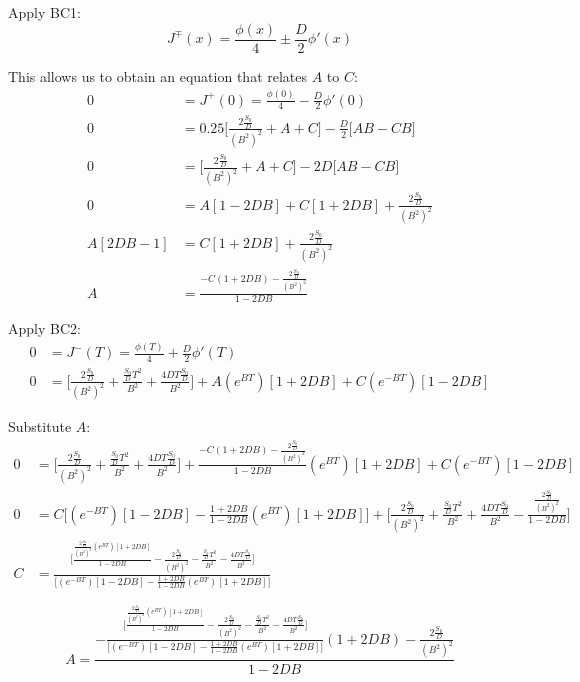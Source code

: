 \documentclass{amsart}
\theoremstyle{definition}
\begin{document}
Apply BC1:
\begin{equation*}
    J^\mp(x) = \frac{\phi(x)}{4} \pm \frac{D}{2} \phi'(x)
\end{equation*}


This allows us to obtain an equation that relates $A$ to $C$:
\begin{align*}
     0 &= J^+(0) = \frac{\phi(0)}{4} - \frac{D}{2} \phi'(0) \\
     0 &= 0.25\bigg[\frac{2\frac{S_0}{D}}{(B^2)^2}+A+C\bigg] - \frac{D}{2}\bigg[AB-CB\bigg] \\
     0 &= \bigg[\frac{2\frac{S_0}{D}}{(B^2)^2}+A+C\bigg] - 2D\bigg[AB-CB\bigg] \\
     0 &= A[1-2DB] + C[1+2DB]+\frac{2\frac{S_0}{D}}{(B^2)^2} \\
     A[2DB-1] &= C[1+2DB]+\frac{2\frac{S_0}{D}}{(B^2)^2} \\
     A &= \frac{-C(1+2DB)-\frac{2\frac{S_0}{D}}{(B^2)^2}}{1-2DB}
\end{align*}


Apply BC2:
\begin{align*}
     0 &= J^-(T) = \frac{\phi(T)}{4} + \frac{D}{2} \phi'(T) \\
     0 &= \bigg[\frac{2\frac{S_0}{D}}{(B^2)^2} + \frac{\frac{S_0}{D}T^2}{B^2}+\frac{4DT\frac{S_0}{D}}{B^2}\bigg] + A(e^{BT})[1+2DB]+C(e^{-BT})[1-2DB]
\end{align*}


Substitute $A$:
\begin{align*}
    0 &= \bigg[\frac{2\frac{S_0}{D}}{(B^2)^2} + \frac{\frac{S_0}{D}T^2}{B^2}+\frac{4DT\frac{S_0}{D}}{B^2}\bigg] + \frac{-C(1+2DB)-\frac{2\frac{S_0}{D}}{(B^2)^2}}{1-2DB}(e^{BT})[1+2DB]+C(e^{-BT})[1-2DB] \\
    0 &= C\bigg[(e^{-BT})[1-2DB] - \frac{1+2DB}{1-2DB}(e^{BT})[1+2DB]\bigg] +\bigg[\frac{2\frac{S_0}{D}}{(B^2)^2} + \frac{\frac{S_0}{D}T^2}{B^2}+\frac{4DT\frac{S_0}{D}}{B^2} - \frac{\frac{2\frac{S_0}{D}}{(B^2)^2}}{1-2DB}\bigg] \\
    C &= \frac{\bigg[\frac{\frac{2\frac{S_0}{D}}{(B^2)^2}(e^{BT})[1+2DB]}{1-2DB} - \frac{2\frac{S_0}{D}}{(B^2)^2} - \frac{\frac{S_0}{D}T^2}{B^2}-\frac{4DT\frac{S_0}{D}}{B^2} \bigg]}{\bigg[(e^{-BT})[1-2DB] - \frac{1+2DB}{1-2DB}(e^{BT})[1+2DB]\bigg]}
\end{align*}


\begin{equation*}
    A = \frac{-\frac{\bigg[\frac{\frac{2\frac{S_0}{D}}{(B^2)^2}(e^{BT})[1+2DB]}{1-2DB} - \frac{2\frac{S_0}{D}}{(B^2)^2} - \frac{\frac{S_0}{D}T^2}{B^2}-\frac{4DT\frac{S_0}{D}}{B^2} \bigg]}{\bigg[(e^{-BT})[1-2DB] - \frac{1+2DB}{1-2DB}(e^{BT})[1+2DB]\bigg]}(1+2DB)-\frac{2\frac{S_0}{D}}{(B^2)^2}}{1-2DB}
\end{equation*}
\end{document}
